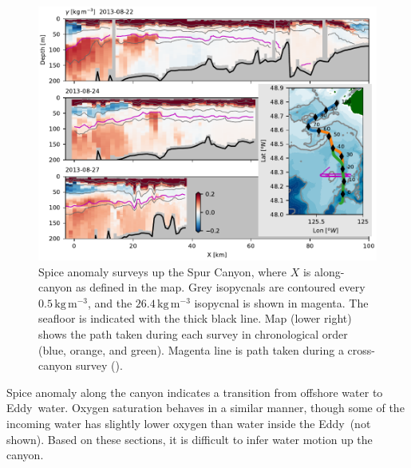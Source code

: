 \documentclass[draft]{agujournal2019}
\newcommand*{\Eddy}{{\sc Eddy}}
\begin{document}
\begin{figure}[htbp]
  \begin{center}
    \includegraphics[width=6.2in]{CanyonPropertiesSpice}
    \caption{Spice anomaly surveys up the Spur Canyon, where $X$ is along-canyon as defined in the map.  Grey isopycnals are contoured every $0.5\,\mathrm{kg\,m^{-3}}$, and the $26.4\,\mathrm{kg\,m^{-3}}$ isopycnal is shown in magenta.  The seafloor is indicated with the thick black line.  Map (lower right) shows the path taken during each survey in chronological order (blue, orange, and green).  Magenta line is path taken during a cross-canyon survey ().
      \label{fig:CanyonPropertiesSpice} }
  \end{center}
\end{figure}

Spice anomaly along the canyon indicates a transition from offshore water to \Eddy\ water.  Oxygen saturation behaves in a similar manner, though some of the incoming water has slightly lower oxygen than water inside the \Eddy\ (not shown).  Based on these sections, it is difficult to infer water motion up the canyon.
\end{document}
